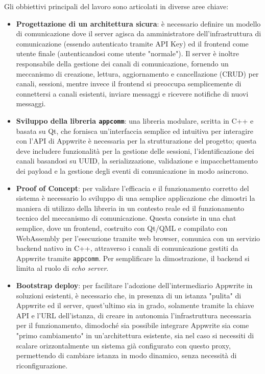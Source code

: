 \documentclass[a4paper, 11pt, twoside]{report}
\begin{document}
\newpage

Gli obbiettivi principali del lavoro sono articolati in diverse aree chiave:
\begin{itemize}
\item \textbf{Progettazione di un architettura sicura}: è necessario definire un modello di comunicazione dove il server
    agisca da amministratore dell'infrastruttura di comunicazione (essendo autenticato tramite API Key) ed il frontend
    come utente finale (autenticandosi come utente "normale").
    Il server è inoltre responsabile della gestione dei canali di comunicazione, fornendo un meccanismo di creazione,
    lettura, aggiornamento e cancellazione (CRUD) per canali, sessioni, mentre invece il frontend si preoccupa
    semplicemente di connettersi a canali esistenti, inviare messaggi e ricevere notifiche di nuovi messaggi.

\item \textbf{Sviluppo della libreria \texttt{appcomm}}: una libreria modulare, scritta in C++ e basata su Qt, che 
    fornisca un'interfaccia semplice ed intuitiva per interagire con l'API di Appwrite è necessaria per la strutturazione
    del progetto; questa deve includere funzionalità per la gestione delle sessioni, l'identificazione dei canali
    basandosi su UUID, la serializzazione, validazione e impacchettamento dei payload e la gestione degli eventi di 
    comunicazione in modo asincrono.

\item \textbf{Proof of Concept}: per validare l'efficacia e il funzionamento corretto del sistema è necessario lo
    sviluppo di una semplice applicazione che dimostri la maniera di utilizzo della libreria in un contesto reale ed il
    funzionamento tecnico del meccanismo di comunicazione. Questa consiste in una chat semplice, dove un frontend,
    costruito con Qt/\gls{QML} e compilato con WebAssembly per l'esecuzione tramite web browser, comunica con un servizio
    backend nativo in C++, attraverso i canali di comunicazione gestiti da Appwrite tramite \texttt{appcomm}.
    Per semplificare la dimostrazione, il backend si limita al ruolo di \textit{echo server}.

\item \textbf{Bootstrap deploy}: per facilitare l'adozione dell'intermediario Appwrite in soluzioni esistenti, è
    necessario che, in presenza di un istanza "pulita" di Appwrite ed il server, quest'ultimo sia in grado, solamente
    tramite la chiave API e l'URL dell'istanza, di creare in autonomia l'infrastruttura necessaria per il funzionamento,
    dimodoché sia possibile integrare Appwrite sia come "primo cambiamento" in un'architettura esistente, sia nel caso
    si necessiti di scalare orizzontalmente un sistema già configurato con questo proxy, permettendo di cambiare istanza
    in modo dinamico, senza necessità di riconfigurazione.
\end{itemize}
\end{document}
